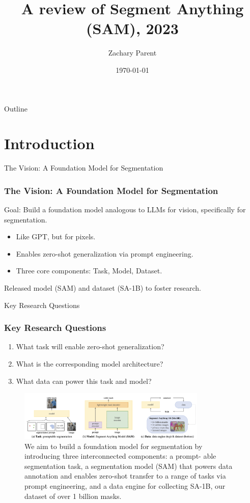 \documentclass{beamer}
\title{A review of \textbf{Segment Anything (SAM)}, 2023}
\author{Zachary Parent}
\date{\today}
\institute{UPC - UB}
\begin{document}
\begin{frame}
    \titlepage
\end{frame}

\begin{frame}{Outline}
    \tableofcontents
\end{frame}

\section{Introduction}

\begin{frame}{The Vision: A Foundation Model for Segmentation}
    \frametitle{The Vision: A Foundation Model for Segmentation}
    Goal: Build a foundation model analogous to LLMs for vision, specifically for segmentation.
    \begin{itemize}
        \item Like GPT, but for pixels.
        \item Enables zero-shot generalization via prompt engineering.
        \item Three core components: Task, Model, Dataset.
    \end{itemize}
    Released model (SAM) and dataset (SA-1B) to foster research.
\end{frame}

\begin{frame}{Key Research Questions}
    \frametitle{Key Research Questions}
    \begin{enumerate}
        \item What task will enable zero-shot generalization?
        \item What is the corresponding model architecture?
        \item What data can power this task and model?
    \end{enumerate}
    \begin{figure}
        \centering
        \includegraphics[width=0.8\textwidth]{figures/SA_overview.png}
        \caption{We aim to build a foundation model for segmentation by introducing three interconnected components: a prompt-
        able segmentation task, a segmentation model (SAM) that powers data annotation and enables zero-shot transfer to a range
        of tasks via prompt engineering, and a data engine for collecting SA-1B, our dataset of over 1 billion masks.}
    \end{figure}
\end{frame}
\end{document}
